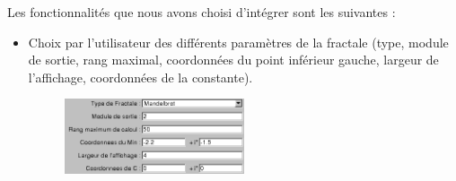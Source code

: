 \documentclass[a4paper,11pt]{article} \usepackage[T1]{fontenc} \usepackage[utf8]{inputenc} \usepackage[francais]{babel}
\begin{document}
Les fonctionnalités que nous avons choisi d'intégrer sont les suivantes :
\begin{itemize}
  \item Choix par l’utilisateur des différents paramètres de la fractale (type, module de sortie, rang maximal, coordonnées du point inférieur gauche, largeur de l’affichage, coordonnées de la constante).
        \begin{figure}[H] \begin{center} \includegraphics[width=0.5\textwidth]{Images/Parametres.png}
            \caption{}
        \end{center} \end{figure}



\end{itemize}
\end{document}
